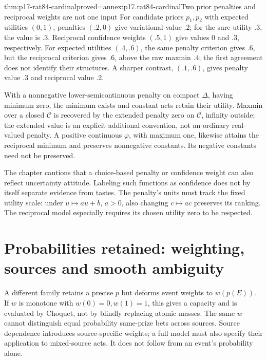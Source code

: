 \begin{hblemma}{thm:p17-rat84-cardinal}{proved=annex:p17.rat84-cardinal}{Two prior penalties and reciprocal weights are not one input}
For candidate priors \(p_1,p_2\) with expected utilities \((0,1)\),
penalties \((.2,0)\) give variational value \(.2\); for the
sure utility \(.3\), the value is \(.3\). Reciprocal confidence
weights \((.5,1)\) give values 0 and \(.3\), respectively.
For expected utilities \((.4,.6)\), the same penalty criterion
gives \(.6\), but the reciprocal criterion gives \(.6\),
above the raw maxmin \(.4\); the first agreement does not identify
their structures. A sharper contrast, \((.1,.6)\), gives
penalty value \(.3\) and reciprocal value \(.2\).

With a nonnegative lower-semicontinuous penalty on compact \(\Delta\),
having minimum zero, the minimum exists and constant acts retain their
utility. Maxmin over a closed \(\mathcal C\) is recovered by the
extended penalty zero on \(\mathcal C\), infinity outside; the
extended value is an explicit additional convention, not an ordinary
real-valued penalty. A positive continuous \(\varphi\), with
maximum one, likewise attains the reciprocal minimum and preserves
nonnegative constants. Its negative constants need not be preserved.
\end{hblemma}

The chapter cautions that a choice-based penalty or confidence weight
can also reflect uncertainty attitude. Labeling such functions as
confidence does not by itself separate evidence from tastes.
The penalty's units must track the fixed utility scale: under
\(u\mapsto au+b\), \(a>0\), also changing \(c\mapsto ac\)
preserves its ranking. The reciprocal model especially requires its
chosen utility zero to be respected.
\cite[Sec.~4, pp.~501--502]{Hill2021DecisionUncertainty}

\section{Probabilities retained: weighting, sources and smooth ambiguity}
\label{sec:p17-rat84-smooth}

A different family retains a precise \(p\) but deforms event weights
to \(w(p(E))\). If \(w\) is monotone with \(w(0)=0,w(1)=1\),
this gives a capacity and is evaluated by Choquet, not by blindly
replacing atomic masses. The same \(w\) cannot distinguish equal
probability same-prize bets across sources. Source dependence introduces
source-specific weights; a full model must also specify their application
to mixed-source acts. It does not follow from an event's probability alone.

